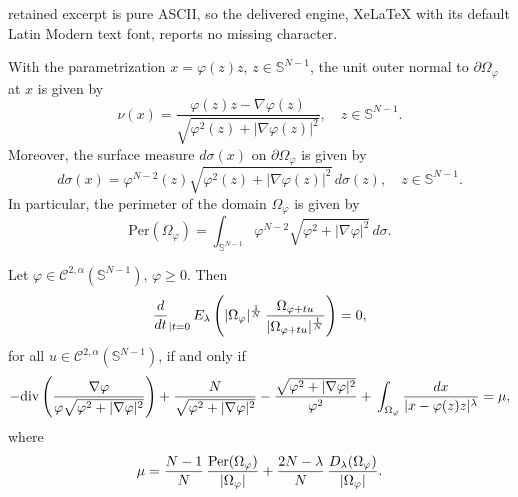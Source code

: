 \documentclass[10pt,a4paper]{amsart}
\newcommand{\Sn}{\mathbb{S}^{N-1}}
\begin{document}
retained excerpt is pure ASCII, so the delivered engine, XeLaTeX with its default Latin Modern text font, reports no missing character.
\begin{lemma}
\label{lemma:per}
 With the parametrization $x=\varphi(z)z$, $z\in\Sn$, the unit outer normal to $\partial\Omega_\varphi$ at $x$ is given by
 \[
 \nu(x)=\frac{\varphi(z)z-\nabla\varphi(z)}{ \sqrt{\varphi^2(z) + |\nabla \varphi(z) |^2} },\quad z\in\Sn.
 \]
 Moreover, the surface measure $d\sigma(x)$ on $\partial\Omega_\varphi$ is given by
 \[
 d\sigma(x)=\varphi^{N-2}(z) \sqrt{\varphi^2(z) + |\nabla \varphi(z) |^2} \, d\sigma(z),\quad z\in\Sn.
 \]
 In particular, the perimeter of the domain $\Omega_\varphi$ is given by
\[
{\mathrm{Per}} (\Omega_{\varphi })=\int_{\mathbb S^{N-1}} \varphi^{N-2} \sqrt{\varphi^2 + |\nabla \varphi |^2} \, d\sigma.
\]
\end{lemma}

\begin{lemma}
\label{lemma1_4D}
Let $\varphi\in\mathcal C^{2,\alpha}(\Sn)$, $\varphi\ge0$. Then 
\[
{d \over dt}_{| t=0} \, E_\lambda \left( |\Omega_\varphi |^{1\over N} \, {\Omega_{\varphi +t u} \over |\Omega_{\varphi+tu}|^{1\over N}} \right) =0,
\]
for all $u\in \mathcal C^{2,\alpha}(\Sn)$, if and only if
\[
-\mathrm{div}\left(\frac{\nabla\varphi}{\varphi\sqrt{ \varphi^2 + |\nabla \varphi|^2}}\right)+\frac{N}{\sqrt{ \varphi^2 + |\nabla \varphi|^2}}-\frac{\sqrt{ \varphi^2 + |\nabla \varphi|^2}}{\varphi^2}+ \,  \int_{\Omega_\varphi}    {  d x\over |x - \varphi (z)   z|^\lambda}=\mu ,
\]
where
\[
\mu= {N-1 \over N} \, {{\mathrm{Per}} (\Omega_{\varphi }) \over  |\Omega_\varphi |} +{2N-\lambda \over N} \,\frac{D_\lambda(\Omega_\varphi) }{|\Omega_\varphi |}.
\]
\end{lemma}
\end{document}
